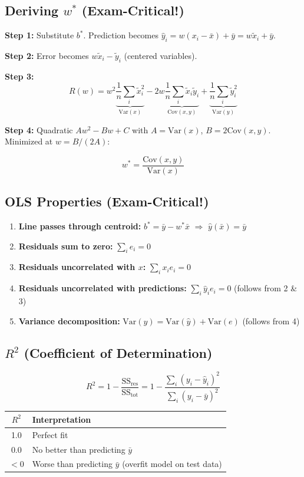 \documentclass[11pt,a4paper]{article}
\begin{document}
\subsection{Deriving $w^*$ (Exam-Critical!)}

\textbf{Step 1:} Substitute $b^*$. Prediction becomes $\hat{y}_i = w(x_i - \bar{x}) + \bar{y} = w\tilde{x}_i + \bar{y}$.

\textbf{Step 2:} Error becomes $w\tilde{x}_i - \tilde{y}_i$ (centered variables).

\textbf{Step 3:}
$$R(w) = w^2 \underbrace{\frac{1}{n}\sum_i \tilde{x}_i^2}_{\text{Var}(x)} - 2w\underbrace{\frac{1}{n}\sum_i \tilde{x}_i\tilde{y}_i}_{\text{Cov}(x,y)} + \underbrace{\frac{1}{n}\sum_i \tilde{y}_i^2}_{\text{Var}(y)}$$

\textbf{Step 4:} Quadratic $Aw^2 - Bw + C$ with $A = \text{Var}(x)$, $B = 2\text{Cov}(x,y)$. Minimized at $w = B/(2A)$:

$$\boxed{w^* = \frac{\text{Cov}(x, y)}{\text{Var}(x)}}$$

\subsection{OLS Properties (Exam-Critical!)}

\begin{enumerate}
    \item \textbf{Line passes through centroid:} $b^* = \bar{y} - w^*\bar{x}$ $\Rightarrow$ $\hat{y}(\bar{x}) = \bar{y}$ \checkmark
    \item \textbf{Residuals sum to zero:} $\sum_i e_i = 0$
    \item \textbf{Residuals uncorrelated with $x$:} $\sum_i x_i e_i = 0$
    \item \textbf{Residuals uncorrelated with predictions:} $\sum_i \hat{y}_i e_i = 0$ (follows from 2 \& 3)
    \item \textbf{Variance decomposition:} $\text{Var}(y) = \text{Var}(\hat{y}) + \text{Var}(e)$ (follows from 4)
\end{enumerate}

\subsection{$R^2$ (Coefficient of Determination)}

$$R^2 = 1 - \frac{\text{SS}_{\text{res}}}{\text{SS}_{\text{tot}}} = 1 - \frac{\sum_i(y_i - \hat{y}_i)^2}{\sum_i(y_i - \bar{y})^2}$$

\begin{center}
\begin{tabular}{|c|l|}
\hline
$R^2$ & \textbf{Interpretation} \\
\hline
1.0 & Perfect fit \\
0.0 & No better than predicting $\bar{y}$ \\
$< 0$ & Worse than predicting $\bar{y}$ (overfit model on test data) \\
\hline
\end{tabular}
\end{center}
\end{document}
